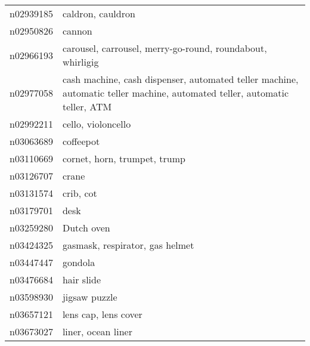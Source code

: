 \begin{appendices}
\begin{scriptsize}
\begin{longtabu}{X|X[4]}
    		n02939185 &                                                                                                          caldron, cauldron \tabularnewline
    		n02950826 &                                                                                                                     cannon \tabularnewline
    		n02966193 &                                                                 carousel, carrousel, merry-go-round, roundabout, whirligig \tabularnewline
    		n02977058 &  cash machine, cash dispenser, automated teller machine, automatic teller machine, automated teller, automatic teller, ATM \tabularnewline
    		n02992211 &                                                                                                         cello, violoncello \tabularnewline
    		n03063689 &                                                                                                                  coffeepot \tabularnewline
    		n03110669 &                                                                                               cornet, horn, trumpet, trump \tabularnewline
    		n03126707 &                                                                                                                      crane \tabularnewline
    		n03131574 &                                                                                                                  crib, cot \tabularnewline
    		n03179701 &                                                                                                                       desk \tabularnewline
    		n03259280 &                                                                                                                 Dutch oven \tabularnewline
    		n03424325 &                                                                                            gasmask, respirator, gas helmet \tabularnewline
    		n03447447 &                                                                                                                    gondola \tabularnewline
    		n03476684 &                                                                                                                 hair slide \tabularnewline
    		n03598930 &                                                                                                              jigsaw puzzle \tabularnewline
    		n03657121 &                                                                                                       lens cap, lens cover \tabularnewline
    		n03673027 &                                                                                                         liner, ocean liner \tabularnewline

\end{longtabu}
\end{scriptsize}
\end{appendices}
